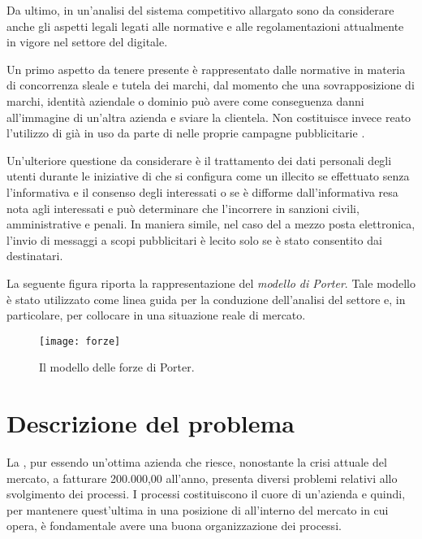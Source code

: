 Da ultimo, in un'analisi del sistema competitivo allargato sono da considerare anche gli aspetti legali legati alle normative e alle regolamentazioni attualmente in vigore nel settore del \mktg digitale.

Un primo aspetto da tenere presente è rappresentato dalle normative in materia di concorrenza sleale e tutela dei marchi, dal momento che una sovrapposizione di marchi, identità aziendale o dominio  può avere come conseguenza danni all'immagine di un'altra azienda e sviare la clientela. Non costituisce invece reato l'utilizzo di  già in uso da parte di  nelle proprie campagne pubblicitarie .

Un'ulteriore questione da considerare è il trattamento dei dati personali degli utenti durante le iniziative di \mktg che si configura come un illecito se effettuato senza l'informativa e il consenso degli interessati o se è difforme dall'informativa resa nota agli interessati e può determinare che l'incorrere in sanzioni civili, amministrative e penali. In maniera simile, nel caso del \mktg a mezzo posta elettronica, l'invio di messaggi a scopi pubblicitari è lecito solo se è stato consentito dai destinatari.

La seguente figura riporta la rappresentazione del \emph{modello di Porter}. Tale modello è stato utilizzato come linea guida per la conduzione dell'analisi del settore e, in particolare, per collocare \customer in una situazione reale di mercato.

\begin{figure}[H]
  \centering
  \label{fig:forze}
  \texttt{[image: forze]}
  \caption{Il modello delle forze di Porter.}
\end{figure}

\section{Descrizione del problema}\label{sec:descrizioneproblema}
La \customer, pur essendo un'ottima azienda che riesce, nonostante la crisi attuale del mercato, a fatturare  200.000,00 \text{\euro} all'anno, presenta diversi problemi relativi allo svolgimento dei processi.
I processi costituiscono il cuore di un'azienda e quindi, per mantenere quest'ultima in una posizione di  all'interno del mercato in cui opera, è fondamentale avere una buona organizzazione dei processi.

